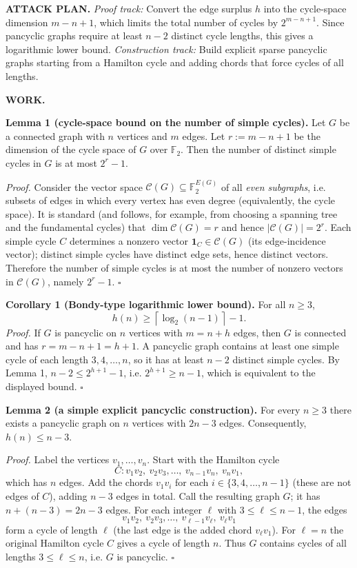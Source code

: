 \medskip
\noindent\textbf{ATTACK PLAN.}
\emph{Proof track:} Convert the edge surplus $h$ into the cycle-space dimension $m-n+1$, which limits the total number of cycles by $2^{m-n+1}$. Since pancyclic graphs require at least $n-2$ distinct cycle lengths, this gives a logarithmic lower bound.
\emph{Construction track:} Build explicit sparse pancyclic graphs starting from a Hamilton cycle and adding chords that force cycles of all lengths.

\medskip
\noindent\textbf{WORK.}

\noindent\textbf{Lemma 1 (cycle-space bound on the number of simple cycles).}
Let $G$ be a connected graph with $n$ vertices and $m$ edges. Let $r:=m-n+1$ be the dimension of the cycle space of $G$ over $\mathbb{F}_2$. Then the number of distinct simple cycles in $G$ is at most $2^r-1$.

\textit{Proof.}
Consider the vector space $\mathcal{C}(G)\subseteq \mathbb{F}_2^{E(G)}$ of all \emph{even subgraphs}, i.e. subsets of edges in which every vertex has even degree (equivalently, the cycle space).
It is standard (and follows, for example, from choosing a spanning tree and the fundamental cycles) that $\dim \mathcal{C}(G)=r$ and hence $|\mathcal{C}(G)|=2^r$.
Each simple cycle $C$ determines a nonzero vector $\mathbf{1}_C\in \mathcal{C}(G)$ (its edge-incidence vector); distinct simple cycles have distinct edge sets, hence distinct vectors.
Therefore the number of simple cycles is at most the number of nonzero vectors in $\mathcal{C}(G)$, namely $2^r-1$.
\hfill$\square$

\medskip
\noindent\textbf{Corollary 1 (Bondy-type logarithmic lower bound).}
For all $n\ge 3$,
\[
h(n)\ge \left\lceil \log_2(n-1)\right\rceil -1.
\]
\textit{Proof.}
If $G$ is pancyclic on $n$ vertices with $m=n+h$ edges, then $G$ is connected and has $r=m-n+1=h+1$.
A pancyclic graph contains at least one simple cycle of each length $3,4,\dots,n$, so it has at least $n-2$ distinct simple cycles.
By Lemma 1, $n-2\le 2^{h+1}-1$, i.e. $2^{h+1}\ge n-1$, which is equivalent to the displayed bound.
\hfill$\square$

\medskip
\noindent\textbf{Lemma 2 (a simple explicit pancyclic construction).}
For every $n\ge 3$ there exists a pancyclic graph on $n$ vertices with $2n-3$ edges. Consequently, $h(n)\le n-3$.

\textit{Proof.}
Label the vertices $v_1,\dots,v_n$.
Start with the Hamilton cycle
\[
C: v_1v_2,\ v_2v_3,\dots,\ v_{n-1}v_n,\ v_nv_1,
\]
which has $n$ edges.
Add the chords $v_1v_i$ for each $i\in\{3,4,\dots,n-1\}$ (these are not edges of $C$), adding $n-3$ edges in total.
Call the resulting graph $G$; it has $n+(n-3)=2n-3$ edges.
For each integer $\ell$ with $3\le \ell\le n-1$, the edges
\[
v_1v_2,\ v_2v_3,\dots,\ v_{\ell-1}v_{\ell},\ v_{\ell}v_1
\]
form a cycle of length $\ell$ (the last edge is the added chord $v_\ell v_1$).
For $\ell=n$ the original Hamilton cycle $C$ gives a cycle of length $n$.
Thus $G$ contains cycles of all lengths $3\le \ell\le n$, i.e. $G$ is pancyclic.
\hfill$\square$

